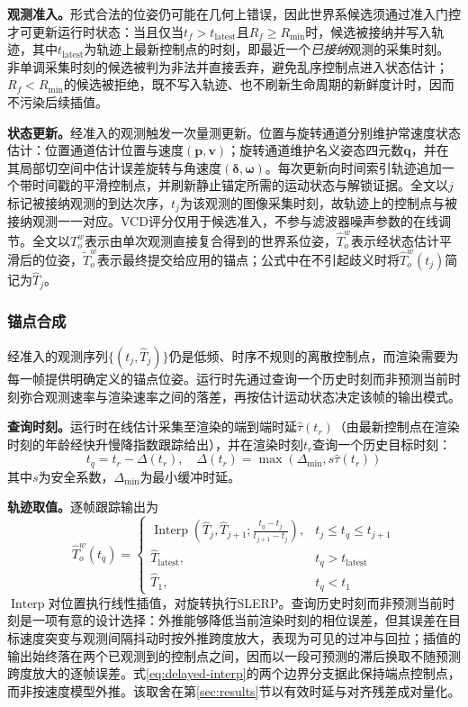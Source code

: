 \documentclass[review]{vgtc}
\begin{document}
\textbf{观测准入。}形式合法的位姿仍可能在几何上错误，因此世界系候选须通过准入门控才可更新运行时状态：当且仅当$t_f > t_{\mathrm{latest}}$且$R_f \geq R_{\min}$时，候选被接纳并写入轨迹，其中$t_{\mathrm{latest}}$为轨迹上最新控制点的时刻，即最近一个\emph{已接纳}观测的采集时刻。非单调采集时刻的候选被判为非法并直接丢弃，避免乱序控制点进入状态估计；$R_f < R_{\min}$的候选被拒绝，既不写入轨迹、也不刷新生命周期的新鲜度计时，因而不污染后续插值。

\textbf{状态更新。}经准入的观测触发一次量测更新。位置与旋转通道分别维护常速度状态估计：位置通道估计位置与速度$(\mathbf{p}, \mathbf{v})$；旋转通道维护名义姿态四元数$\mathbf{q}$，并在其局部切空间中估计误差旋转与角速度$(\boldsymbol{\delta}, \boldsymbol{\omega})$。每次更新向时间索引轨迹追加一个带时间戳的平滑控制点，并刷新静止锚定所需的运动状态与解锁证据。全文以$j$标记被接纳观测的到达次序，$t_j$为该观测的图像采集时刻，故轨迹上的控制点与被接纳观测一一对应。VCD评分仅用于候选准入，不参与滤波器噪声参数的在线调节。全文以$T_o^w$表示由单次观测直接复合得到的世界系位姿，$\widehat{T}_o^w$表示经状态估计平滑后的位姿，$\widetilde{T}_o^w$表示最终提交给应用的锚点；公式中在不引起歧义时将$\widehat{T}_o^w(t_j)$简记为$\widehat{T}_j$。

\subsubsection{锚点合成}\label{sec:frame-output}

经准入的观测序列$\{(t_j, \widehat{T}_j)\}$仍是低频、时序不规则的离散控制点，而渲染需要为每一帧提供明确定义的锚点位姿。运行时先通过查询一个历史时刻而非预测当前时刻弥合观测速率与渲染速率之间的落差，再按估计运动状态决定该帧的输出模式。

\textbf{查询时刻。}运行时在线估计采集至渲染的端到端时延$\widehat{\tau}(t_r)$（由最新控制点在渲染时刻的年龄经快升慢降指数跟踪给出），并在渲染时刻$t_r$查询一个历史目标时刻：
\begin{equation}
t_q = t_r - \Delta(t_r), \quad \Delta(t_r) = \max\!\left(\Delta_{\min}, s\widehat{\tau}(t_r)\right)
\label{eq:target-time}
\end{equation}
其中$s$为安全系数，$\Delta_{\min}$为最小缓冲时延。

\textbf{轨迹取值。}逐帧跟踪输出为
\begin{equation}
\widehat{T}_o^w(t_q) = \begin{cases}
\operatorname{Interp}\!\left(\widehat{T}_j, \widehat{T}_{j+1}; \frac{t_q - t_j}{t_{j+1} - t_j}\right), & t_j \leq t_q \leq t_{j+1} \\
\widehat{T}_{\mathrm{latest}}, & t_q > t_{\mathrm{latest}} \\
\widehat{T}_1, & t_q < t_1
\end{cases}
\label{eq:delayed-interp}
\end{equation}
$\operatorname{Interp}$对位置执行线性插值，对旋转执行SLERP。查询历史时刻而非预测当前时刻是一项有意的设计选择：外推能够降低当前渲染时刻的相位误差，但其误差在目标速度突变与观测间隔抖动时按外推跨度放大，表现为可见的过冲与回拉；插值的输出始终落在两个已观测到的控制点之间，因而以一段可预测的滞后换取不随预测跨度放大的逐帧误差。式\eqref{eq:delayed-interp}的两个边界分支据此保持端点控制点，而非按速度模型外推。该取舍在第\ref{sec:results}节以有效时延与对齐残差成对量化。
\end{document}
